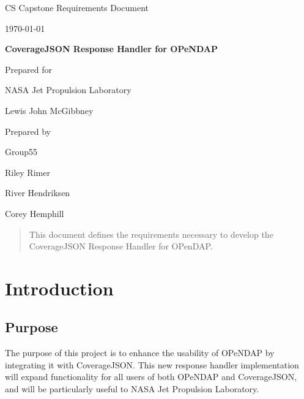 \documentclass[onecolumn, draftclsnofoot,10pt, compsoc]{IEEEtran}
\def \CapstoneTeamNumber{55}
\def \GroupMemberOne{Riley Rimer}
\def \GroupMemberTwo{River Hendriksen}
\def \GroupMemberThree{Corey Hemphill}
\def \CapstoneProjectName{CoverageJSON Response Handler for OPeNDAP}
\def \CapstoneSponsorCompany{NASA Jet Propulsion Laboratory}
\def \CapstoneSponsorPerson{Lewis John McGibbney}
\def \DocType{	%
				Requirements Document
				}
\newcommand{\NameSigPair}[1]{\par
\makebox[2.75in][r]{#1} \hfil 	\makebox[3.25in]{\makebox[2.25in]{\hrulefill} \hfill		\makebox[.75in]{\hrulefill}}
\par\vspace{-12pt} \textit{\tiny\noindent
\makebox[2.75in]{} \hfil		\makebox[3.25in]{\makebox[2.25in][r]{Signature} \hfill	\makebox[.75in][r]{Date}}}}
\renewcommand{\NameSigPair}[1]{#1}
\begin{document}
\begin{titlepage}
    \begin{singlespace}
        \hfill    
        \par\vspace{.2in}
        \centering
        \scshape{
            \huge CS Capstone \DocType \par
            {\large\today}\par
            \vspace{.5in}
            \textbf{\Huge\CapstoneProjectName}\par
                        \vspace{.5in}

            \vfill
            {\large Prepared for}\par
            \Huge \CapstoneSponsorCompany\par
            \vspace{5pt}
            {\Large\NameSigPair{\CapstoneSponsorPerson}\par}
            {\large Prepared by }\par
            Group\CapstoneTeamNumber\par
            \vspace{5pt}
            {\Large
                \NameSigPair{\GroupMemberOne}\par
                \NameSigPair{\GroupMemberTwo}\par
                \NameSigPair{\GroupMemberThree}\par
            }
            \vspace{20pt}
        }
        \begin{abstract}
        	This document defines the requirements necessary to develop the CoverageJSON Response Handler for OPenDAP. 
        \end{abstract}     
    \end{singlespace}
\end{titlepage}
\newpage
{}
\clearpage

\section{Introduction}
\subsection{Purpose}
The purpose of this project is to enhance the usability of OPeNDAP by integrating it with CoverageJSON.
This new response handler implementation will expand functionality for all users of both OPeNDAP and CoverageJSON, and will be particularly useful to NASA Jet Propulsion Laboratory.
\end{document}
